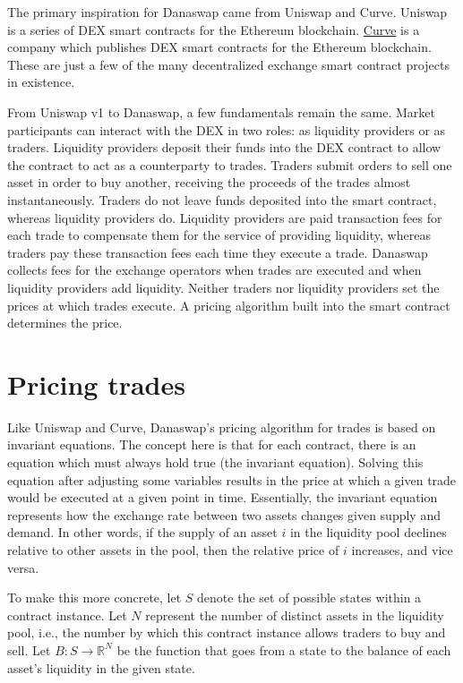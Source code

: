 \documentclass[12pt]{article}
\begin{document}
The primary inspiration for Danaswap came from Uniswap and Curve. Uniswap is a series of DEX smart contracts for the Ethereum blockchain. \cite{uniswap1,uniswap2,uniswap3} \href{https://curve.fi/}{Curve} is a company which publishes DEX smart contracts for the Ethereum blockchain. \cite{stableswap,curvecrypto} These are just a few of the many decentralized exchange smart contract projects in existence.

From Uniswap v1 to Danaswap, a few fundamentals remain the same. Market participants can interact with the DEX in two roles: as liquidity providers or as traders. Liquidity providers deposit their funds into the DEX contract to allow the contract to act as a counterparty to trades. Traders submit orders to sell one asset in order to buy another, receiving the proceeds of the trades almost instantaneously. Traders do not leave funds deposited into the smart contract, whereas liquidity providers do. Liquidity providers are paid transaction fees for each trade to compensate them for the service of providing liquidity, whereas traders pay these transaction fees each time they execute a trade. Danaswap collects fees for the exchange operators when trades are executed and when liquidity providers add liquidity. Neither traders nor liquidity providers set the prices at which trades execute. A pricing algorithm built into the smart contract determines the price. 

\section{Pricing trades}

Like Uniswap and Curve, Danaswap's pricing algorithm for trades is based on invariant equations. The concept here is that for each contract, there is an equation which must always hold true (the invariant equation). Solving this equation after adjusting some variables results in the price at which a given trade would be executed at a given point in time. Essentially, the invariant equation represents how the exchange rate between two assets changes given supply and demand. In other words, if the supply of an asset $i$ in the liquidity pool declines relative to other assets in the pool, then the relative price of $i$ increases, and vice versa.

To make this more concrete, let $S$ denote the set of possible states within a contract instance. Let $N$ represent the number of distinct assets in the liquidity pool, i.e., the number by which this contract instance allows traders to buy and sell. Let $B : S \to \mathbb{R}^N$ be the function that goes from a state to the balance of each asset's liquidity in the given state.
\end{document}
